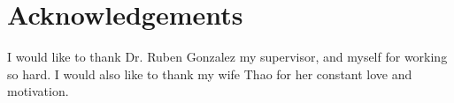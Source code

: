 \makeatletter
\chapter{Acknowledgements}

I would like to thank Dr. Ruben Gonzalez my supervisor, and myself for working so hard. I would also like to thank my wife Thao for her constant love and motivation.